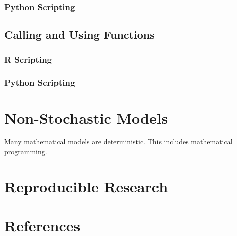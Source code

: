 \documentclass[]{book}
\theoremstyle{definition}
\theoremstyle{definition}
\theoremstyle{definition}
\theoremstyle{remark}
\begin{document}
\subsection{Python Scripting}\label{python-scripting-11}

\section{Calling and Using
Functions}\label{calling-and-using-functions-2}

\subsection{R Scripting}\label{r-scripting-12}

\subsection{Python Scripting}\label{python-scripting-12}

\chapter{Non-Stochastic Models}\label{non-stochastic-models}

Many mathematical models are deterministic. This includes mathematical
programming.

\chapter{Reproducible Research}\label{reproducible-research}

\chapter{References}\label{references}
\end{document}
